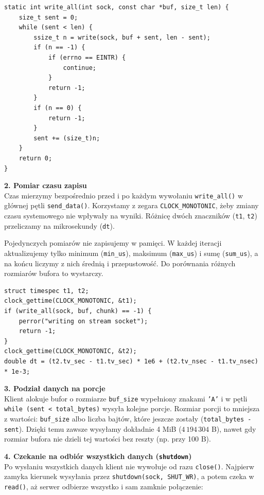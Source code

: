 \documentclass[12pt,a4paper]{article}
\begin{document}
\begin{lstlisting}
static int write_all(int sock, const char *buf, size_t len) {
    size_t sent = 0;
    while (sent < len) {
        ssize_t n = write(sock, buf + sent, len - sent);
        if (n == -1) {
            if (errno == EINTR) {
                continue;
            }
            return -1;
        }
        if (n == 0) {
            return -1;
        }
        sent += (size_t)n;
    }
    return 0;
}
\end{lstlisting}

\textbf{2. Pomiar czasu zapisu} \\
Czas mierzymy bezpośrednio przed i po każdym wywołaniu \texttt{write\_all()} w głównej pętli \texttt{send\_data()}. Korzystamy z zegara \texttt{CLOCK\_MONOTONIC}, żeby zmiany czasu systemowego nie wpływały na wyniki. Różnicę dwóch znaczników (\texttt{t1}, \texttt{t2}) przeliczamy na mikrosekundy (\texttt{dt}).

Pojedynczych pomiarów nie zapisujemy w pamięci. W każdej iteracji aktualizujemy tylko minimum (\texttt{min\_us}), maksimum (\texttt{max\_us}) i sumę (\texttt{sum\_us}), a na końcu liczymy z nich średnią i przepustowość. Do porównania różnych rozmiarów bufora to wystarczy.

\begin{lstlisting}
struct timespec t1, t2;
clock_gettime(CLOCK_MONOTONIC, &t1);
if (write_all(sock, buf, chunk) == -1) {
    perror("writing on stream socket");
    return -1;
}
clock_gettime(CLOCK_MONOTONIC, &t2);
double dt = (t2.tv_sec - t1.tv_sec) * 1e6 + (t2.tv_nsec - t1.tv_nsec) * 1e-3;
\end{lstlisting}

\textbf{3. Podział danych na porcje} \\
Klient alokuje bufor o rozmiarze \texttt{buf\_size} wypełniony znakami \texttt{'A'} i w pętli \texttt{while (sent < total\_bytes)} wysyła kolejne porcje. Rozmiar porcji to mniejsza z wartości: \texttt{buf\_size} albo liczba bajtów, które jeszcze zostały (\texttt{total\_bytes - sent}). Dzięki temu zawsze wysyłamy dokładnie 4 MiB ($4\,194\,304$ B), nawet gdy rozmiar bufora nie dzieli tej wartości bez reszty (np. przy 100 B).

\textbf{4. Czekanie na odbiór wszystkich danych (\texttt{shutdown})} \\
Po wysłaniu wszystkich danych klient nie wywołuje od razu \texttt{close()}. Najpierw zamyka kierunek wysyłania przez \texttt{shutdown(sock, SHUT\_WR)}, a potem czeka w \texttt{read()}, aż serwer odbierze wszystko i sam zamknie połączenie:
\end{document}
